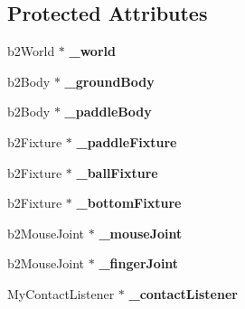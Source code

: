 \subsection*{Protected Attributes}
\begin{DoxyCompactItemize}
\item 
\hypertarget{interface_hello_world_a9723710618968a996a536bf687693185}{b2\-World $\ast$ {\bfseries \-\_\-world}}\label{dd/d0c/interface_hello_world_a9723710618968a996a536bf687693185}

\item 
\hypertarget{interface_hello_world_a70977599a3868acd441efe7088584745}{b2\-Body $\ast$ {\bfseries \-\_\-ground\-Body}}\label{dd/d0c/interface_hello_world_a70977599a3868acd441efe7088584745}

\item 
\hypertarget{interface_hello_world_af805f299cecdde22032b5b33ce812d63}{b2\-Body $\ast$ {\bfseries \-\_\-paddle\-Body}}\label{dd/d0c/interface_hello_world_af805f299cecdde22032b5b33ce812d63}

\item 
\hypertarget{interface_hello_world_aeaf675cad503a3088e045975ae0e35ba}{b2\-Fixture $\ast$ {\bfseries \-\_\-paddle\-Fixture}}\label{dd/d0c/interface_hello_world_aeaf675cad503a3088e045975ae0e35ba}

\item 
\hypertarget{interface_hello_world_acf16737495743ff9703573599bfe0c2f}{b2\-Fixture $\ast$ {\bfseries \-\_\-ball\-Fixture}}\label{dd/d0c/interface_hello_world_acf16737495743ff9703573599bfe0c2f}

\item 
\hypertarget{interface_hello_world_a8948342e97f38ccdce272b4110e67c96}{b2\-Fixture $\ast$ {\bfseries \-\_\-bottom\-Fixture}}\label{dd/d0c/interface_hello_world_a8948342e97f38ccdce272b4110e67c96}

\item 
\hypertarget{interface_hello_world_adeaa5b02c710fc36aeb98fe6528b07c0}{b2\-Mouse\-Joint $\ast$ {\bfseries \-\_\-mouse\-Joint}}\label{dd/d0c/interface_hello_world_adeaa5b02c710fc36aeb98fe6528b07c0}

\item 
\hypertarget{interface_hello_world_ab8bfb6b3e053aad4e395b654e722bf9e}{b2\-Mouse\-Joint $\ast$ {\bfseries \-\_\-finger\-Joint}}\label{dd/d0c/interface_hello_world_ab8bfb6b3e053aad4e395b654e722bf9e}

\item 
\hypertarget{interface_hello_world_a6d39f287d5cb57fb6f117d07112f823c}{My\-Contact\-Listener $\ast$ {\bfseries \-\_\-contact\-Listener}}\label{dd/d0c/interface_hello_world_a6d39f287d5cb57fb6f117d07112f823c}


\end{DoxyCompactItemize}
